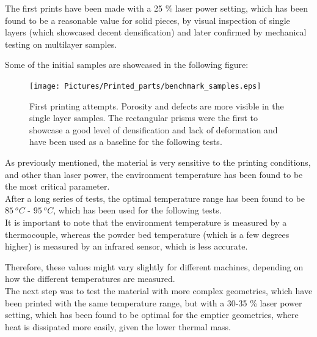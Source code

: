 \documentclass{article}
\begin{document}
        The first prints have been made with a 25 \%  laser power setting, which has been found to be 
        a reasonable value for solid pieces, by visual inspection of single layers (which showcased 
        decent densification) and later confirmed by 
        mechanical testing on multilayer samples. 
        
        \clearpage

        Some of the initial samples are showcased in the following figure: 

        \begin{figure}[h!]
            \centering
            \texttt{[image: Pictures/Printed\_parts/benchmark\_samples.eps]}
            \caption{First printing attempts. Porosity and defects are more visible in the single layer samples.
            The rectangular prisms were the first to showcase a good level of densification and lack of deformation and 
            have been used as a baseline for the following tests.}
            \label{fig:printed_benchmarks}
        \end{figure}

        As previously mentioned, the material is very sensitive to the printing conditions, and other than laser power,
        the environment temperature has been found to be the most critical parameter. \\ 

        After a long series of tests, the optimal temperature range has been found to be $85 \ ^oC$ - $95 \ ^oC$, which has been
        used for the following tests. \\ 

        It is important to note that the environment temperature is measured by a thermocouple, whereas the 
        powder bed temperature (which is a few degrees higher) is measured by an infrared sensor, which  
        is less accurate. 

        Therefore, these values might vary slightly for different machines, depending on how the different 
        temperatures are measured. \\ 

        The next step was to test the material with more complex geometries, which have been printed with the same 
        temperature range, but with a 30-35 \% laser power setting, which has been found to be optimal for the 
        emptier geometries, where heat is dissipated more easily, given the lower thermal mass. \\ 
\end{document}
